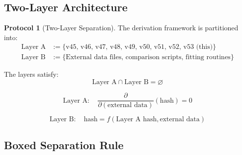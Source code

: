\documentclass[11pt,a4paper]{article}
\theoremstyle{definition}
\newtheorem{protocol}{Protocol}[section]
\begin{document}
\subsection{Two-Layer Architecture}
\label{subsec:two_layer}

\begin{protocol}[Two-Layer Separation]
\label{prot:two_layer}
The derivation framework is partitioned into:
\begin{align}
\label{eq:layer_a_def}
\text{Layer A} &:= \{\text{v45, v46, v47, v48, v49, v50, v51, v52, v53 (this)}\} \\
\label{eq:layer_b_def}
\text{Layer B} &:= \{\text{External data files, comparison scripts, fitting routines}\}
\end{align}

The layers satisfy:
\begin{equation}
\label{eq:layer_intersection}
\text{Layer A} \cap \text{Layer B} = \varnothing
\end{equation}
\end{protocol}

\begin{equation}
\label{eq:layer_a_immutable}
\text{Layer A}: \quad \frac{\partial}{\partial(\text{external data})}(\text{hash}) = 0
\end{equation}

\begin{equation}
\label{eq:layer_b_dependent}
\text{Layer B}: \quad \text{hash} = f(\text{Layer A hash}, \text{external data})
\end{equation}

\subsection{Boxed Separation Rule}
\label{subsec:boxed_rule}
\end{document}
